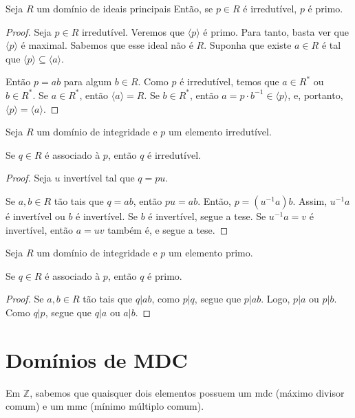 \begin{prop}
    Seja $R$ um domínio de ideais principais
    Então, se $p \in R$ é irredutível, $p$ é primo.
\end{prop}
\begin{proof}
    Seja $p \in R$ irredutível.
    Veremos que $\langle p\rangle$ é primo.
    Para tanto, basta ver que $\langle p\rangle$ é maximal.
    Sabemos que esse ideal não é $R$.
    Suponha que existe $a \in R$ é tal que $\langle p\rangle \subseteq \langle a\rangle$.

    Então $p=ab$ para algum $b \in R$.
    Como $p$ é irredutível, temos que $a \in R^*$ ou $b \in R^*$.
    Se $a \in R^*$, então $\langle a\rangle=R$.
    Se $b \in R^*$, então $a=p\cdot b^{-1}\in \langle p\rangle$, e, portanto, $\langle p\rangle=\langle a\rangle$.
\end{proof}

\begin{lemma}
Seja $R$ um domínio de integridade e $p$ um elemento irredutível.

Se $q \in R$ é associado à $p$, então $q$ é irredutível.
\end{lemma}
\begin{proof}
    Seja $u$ invertível tal que $q=pu$.

    Se $a, b \in R$ tão tais que $q=ab$, então $pu=ab$.
    Então, $p=(u^{-1}a)b$.
    Assim, $u^{-1}a$ é invertível ou $b$ é invertível.
    Se $b$ é invertível, segue a tese.
    Se $u^{-1}a=v$ é invertível, então $a=uv$ também é, e segue a tese.
\end{proof}

\begin{lemma}
    Seja $R$ um domínio de integridade e $p$ um elemento primo.
    
    Se $q \in R$ é associado à $p$, então $q$ é primo.
    
\end{lemma}
    
\begin{proof}
    Se $a, b \in R$ tão tais que $q|ab$, como $p|q$, segue que $p|ab$.
    Logo, $p|a$ ou $p|b$.
    Como $q|p$, segue que $q|a$ ou $a|b$.
\end{proof}



\section{Domínios de MDC}
Em $\mathbb Z$, sabemos que quaisquer dois elementos possuem um mdc (máximo divisor comum) e um mmc (mínimo múltiplo comum).

